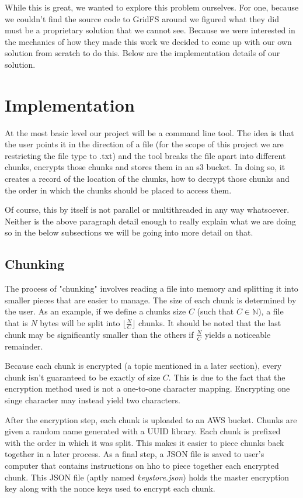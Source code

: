\documentclass[conference]{IEEEtran}
\begin{document}
While this is great, we wanted to explore this problem ourselves.
For one, because we couldn't find the source code to GridFS around we figured what they did must be a proprietary solution that we cannot see.
Because we were interested in the mechanics of how they made this work we decided to come up with our own solution from scratch to do this.
Below are the implementation details of our solution.

\section{Implementation}

At the most basic level our project will be a command line tool.
The idea is that the user points it in the direction of a file (for the scope of this project we are restricting the file type to .txt)
and the tool breaks the file apart into different chunks, encrypts those chunks and stores them in an s3 bucket.
In doing so, it creates a record of the location of the chunks, how to decrypt those chunks and the order in which the chunks should be placed to access them.

Of course, this by itself is not parallel or multithreaded in any way whatsoever.
Neither is the above paragraph detail enough to really explain what we are doing so in the below subsections we will be going into more detail on that.

\subsection{Chunking}

The process of "chunking" involves reading a file into memory and splitting it into smaller
pieces that are easier to manage. The size of each chunk is determined by the user. As an example,
if we define a chunks size $C$ (such that $C \in \mathbb{N}$), a file that is $N$ bytes will
be split into $\lfloor \frac{N}{C} \rfloor$ chunks. It should be noted that the last chunk
may be significantly smaller than the others if $\frac{N}{C}$ yields a noticeable remainder.

\medskip
\indent
Because each chunk is encrypted (a topic mentioned in a later section), every chunk isn't
guaranteed to be exactly of size $C$. This is due to the fact that the encryption method
used is not a one-to-one character mapping. Encrypting one singe character may instead
yield two characters.

\medskip
\indent
After the encryption step, each chunk is uploaded to an AWS bucket. Chunks are given a random
name generated with a UUID library. Each chunk is prefixed with the order in which it was split.
This makes it easier to piece chunks back together in a later process. As a final step, a JSON
file is saved to user's computer that contains instructions on hho to piece together each encrypted
chunk. This JSON file (aptly named \textit{keystore.json}) holds the master encryption key along
with the nonce keys used to encrypt each chunk.
\end{document}
